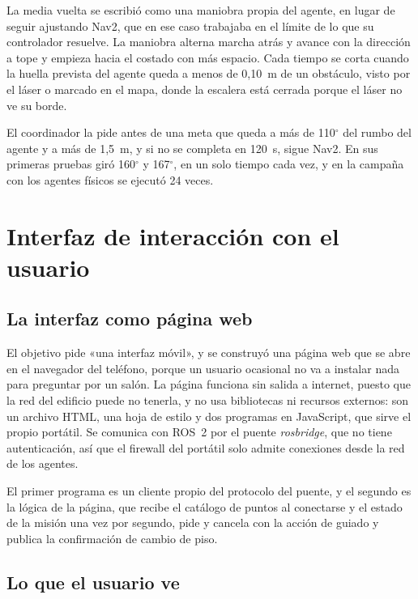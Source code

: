 La media vuelta se escribió como una maniobra propia del agente, en lugar de seguir ajustando Nav2, que en ese caso trabajaba en el límite de lo que su controlador resuelve. La maniobra alterna marcha atrás y
avance con la dirección a tope y empieza hacia el costado con más espacio. Cada tiempo se corta cuando la huella prevista del agente queda a menos de 0,10~m de un obstáculo, visto por el láser o marcado en el
mapa, donde la escalera está cerrada porque el láser no ve su borde.

El coordinador la pide antes de una meta que queda a más de 110$^\circ$ del rumbo del agente y a más de 1,5~m, y si no se completa en 120~s, sigue Nav2. En sus primeras pruebas giró 160$^\circ$ y 167$^\circ$,
en un solo tiempo cada vez, y en la campaña con los agentes físicos se ejecutó 24 veces.

\section{Interfaz de interacción con el usuario}
\label{sec:oe3}

\subsection{La interfaz como página web}

El objetivo pide «una interfaz móvil», y se construyó una página web que se abre en el navegador del teléfono, porque un usuario ocasional no va a instalar nada para preguntar por un salón. La página funciona sin
salida a internet, puesto que la red del edificio puede no tenerla, y no usa bibliotecas ni recursos externos: son un archivo HTML, una hoja de estilo y dos programas en JavaScript, que sirve el propio portátil.
Se comunica con ROS~2 por el puente \textit{rosbridge}, que no tiene autenticación, así que el firewall del portátil solo admite conexiones desde la red de los agentes.

El primer programa es un cliente propio del protocolo del puente, y el segundo es la lógica de la página, que recibe el catálogo de puntos al conectarse y el estado de la misión una vez por segundo, pide y cancela
con la acción de guiado y publica la confirmación de cambio de piso.

\subsection{Lo que el usuario ve}

